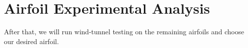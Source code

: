 \section{Airfoil Experimental Analysis}
\begin{comment}
\end{comment}

After that, we will run wind-tunnel testing on the remaining airfoils and choose our desired airfoil.

